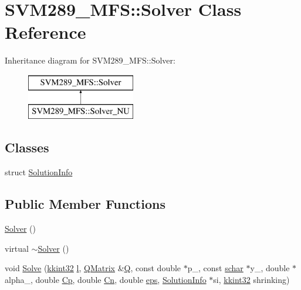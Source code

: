\hypertarget{class_s_v_m289___m_f_s_1_1_solver}{}\section{S\+V\+M289\+\_\+\+M\+FS\+:\+:Solver Class Reference}
\label{class_s_v_m289___m_f_s_1_1_solver}
Inheritance diagram for S\+V\+M289\+\_\+\+M\+FS\+:\+:Solver\+:\begin{figure}[H]
\begin{center}
\leavevmode
\includegraphics[height=2.000000cm]{class_s_v_m289___m_f_s_1_1_solver}
\end{center}
\end{figure}
\subsection*{Classes}
\begin{DoxyCompactItemize}
\item 
struct \hyperlink{struct_s_v_m289___m_f_s_1_1_solver_1_1_solution_info}{Solution\+Info}
\end{DoxyCompactItemize}
\subsection*{Public Member Functions}
\begin{DoxyCompactItemize}
\item 
\hyperlink{class_s_v_m289___m_f_s_1_1_solver_ac34001636e4ad03b08935d57affe4d6c}{Solver} ()
\item 
virtual \hyperlink{class_s_v_m289___m_f_s_1_1_solver_ae0effb4e406736501ddeba7026c0e688}{$\sim$\+Solver} ()
\item 
void \hyperlink{class_s_v_m289___m_f_s_1_1_solver_a56d615f6e895522527fd930534956d67}{Solve} (\hyperlink{namespace_k_k_b_a8fa4952cc84fda1de4bec1fbdd8d5b1b}{kkint32} \hyperlink{class_s_v_m289___m_f_s_1_1_solver_a3b58f02675a93b7f559946c731beebd5}{l}, \hyperlink{class_s_v_m289___m_f_s_1_1_q_matrix}{Q\+Matrix} \&\hyperlink{class_s_v_m289___m_f_s_1_1_solver_a5655aaf1c92b609e8ed2087e08b053eb}{Q}, const double $\ast$p\+\_\+, const \hyperlink{namespace_s_v_m289___m_f_s_a27545e8471784d831870feacd3e831ff}{schar} $\ast$y\+\_\+, double $\ast$alpha\+\_\+, double \hyperlink{class_s_v_m289___m_f_s_1_1_solver_a951f59ea72f372f0e188c5815774fc6d}{Cp}, double \hyperlink{class_s_v_m289___m_f_s_1_1_solver_a56f6a320000a868937411fa4cfd458b5}{Cn}, double \hyperlink{class_s_v_m289___m_f_s_1_1_solver_afc19fe2ebf0ad2239f9f1c6db2d85c12}{eps}, \hyperlink{struct_s_v_m289___m_f_s_1_1_solver_1_1_solution_info}{Solution\+Info} $\ast$si, \hyperlink{namespace_k_k_b_a8fa4952cc84fda1de4bec1fbdd8d5b1b}{kkint32} shrinking)
\end{DoxyCompactItemize}
